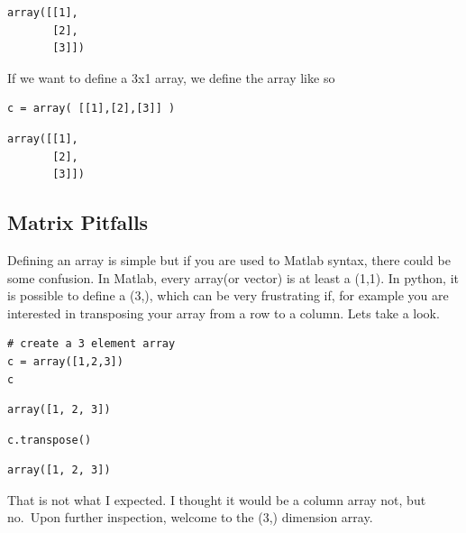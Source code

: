 \documentclass[%
oneside,                 %
final,                   %
10pt]{article}
\begin{document}
\begin{Verbatim}[numbers=none,fontsize=\fontsize{9pt}{9pt},baselinestretch=0.95,xleftmargin=2mm]
array([[1],
       [2],
       [3]])
\end{Verbatim}

If we want to define a 3x1 array, we define the array like so
\begin{Verbatim}[numbers=none,fontsize=\fontsize{9pt}{9pt},baselinestretch=0.95,xleftmargin=2mm]
c = array( [[1],[2],[3]] )
\end{Verbatim}

\begin{Verbatim}[numbers=none,fontsize=\fontsize{9pt}{9pt},baselinestretch=0.95,xleftmargin=2mm]
array([[1],
       [2],
       [3]])
\end{Verbatim}

\subsection{Matrix Pitfalls}

Defining an array is simple but if you are used to Matlab syntax, there could be some confusion. In Matlab, every array(or vector) is at least a (1,1). In python, it is possible to define a (3,), which can be very frustrating if, for example you are interested in transposing your array from a row to a column. Lets take a look.

\begin{Verbatim}[numbers=none,fontsize=\fontsize{9pt}{9pt},baselinestretch=0.95,xleftmargin=2mm]
# create a 3 element array
c = array([1,2,3])
c
\end{Verbatim}

\begin{Verbatim}[numbers=none,fontsize=\fontsize{9pt}{9pt},baselinestretch=0.95,xleftmargin=2mm]
array([1, 2, 3])
\end{Verbatim}

\begin{Verbatim}[numbers=none,fontsize=\fontsize{9pt}{9pt},baselinestretch=0.95,xleftmargin=2mm]
c.transpose()
\end{Verbatim}

\begin{Verbatim}[numbers=none,fontsize=\fontsize{9pt}{9pt},baselinestretch=0.95,xleftmargin=2mm]
array([1, 2, 3])
\end{Verbatim}

That is not what I expected. I thought it would be a column array not, but no.~Upon further inspection, welcome to the (3,) dimension array.
\end{document}
